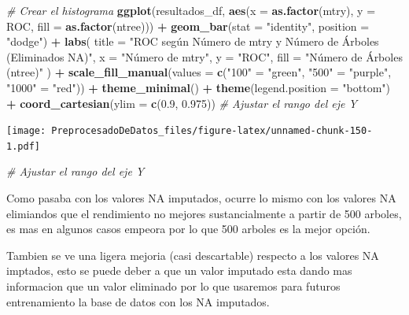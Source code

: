 \documentclass[
]{article}
\newenvironment{Shaded}{\begin{snugshade}}{\end{snugshade}}
\newcommand{\AttributeTok}[1]{\textcolor[rgb]{0.13,0.29,0.53}{#1}}
\newcommand{\CommentTok}[1]{\textcolor[rgb]{0.56,0.35,0.01}{\textit{#1}}}
\newcommand{\FloatTok}[1]{\textcolor[rgb]{0.00,0.00,0.81}{#1}}
\newcommand{\FunctionTok}[1]{\textcolor[rgb]{0.13,0.29,0.53}{\textbf{#1}}}
\newcommand{\NormalTok}[1]{#1}
\newcommand{\OtherTok}[1]{\textcolor[rgb]{0.56,0.35,0.01}{#1}}
\newcommand{\SpecialCharTok}[1]{\textcolor[rgb]{0.81,0.36,0.00}{\textbf{#1}}}
\newcommand{\StringTok}[1]{\textcolor[rgb]{0.31,0.60,0.02}{#1}}
\begin{document}
\begin{Shaded}
\begin{Highlighting}[]
\CommentTok{\# Crear el histograma}
\FunctionTok{ggplot}\NormalTok{(resultados\_df, }\FunctionTok{aes}\NormalTok{(}\AttributeTok{x =} \FunctionTok{as.factor}\NormalTok{(mtry), }\AttributeTok{y =}\NormalTok{ ROC, }\AttributeTok{fill =} \FunctionTok{as.factor}\NormalTok{(ntree))) }\SpecialCharTok{+}
  \FunctionTok{geom\_bar}\NormalTok{(}\AttributeTok{stat =} \StringTok{"identity"}\NormalTok{, }\AttributeTok{position =} \StringTok{"dodge"}\NormalTok{) }\SpecialCharTok{+}
  \FunctionTok{labs}\NormalTok{(}
    \AttributeTok{title =} \StringTok{"ROC según Número de mtry y Número de Árboles (Eliminados NA)"}\NormalTok{,}
    \AttributeTok{x =} \StringTok{"Número de mtry"}\NormalTok{,}
    \AttributeTok{y =} \StringTok{"ROC"}\NormalTok{,}
    \AttributeTok{fill =} \StringTok{"Número de Árboles (ntree)"}
\NormalTok{  ) }\SpecialCharTok{+}
  \FunctionTok{scale\_fill\_manual}\NormalTok{(}\AttributeTok{values =} \FunctionTok{c}\NormalTok{(}\StringTok{"100"} \OtherTok{=} \StringTok{"green"}\NormalTok{, }\StringTok{"500"} \OtherTok{=} \StringTok{"purple"}\NormalTok{, }\StringTok{"1000"} \OtherTok{=} \StringTok{"red"}\NormalTok{)) }\SpecialCharTok{+}
  \FunctionTok{theme\_minimal}\NormalTok{() }\SpecialCharTok{+}
  \FunctionTok{theme}\NormalTok{(}\AttributeTok{legend.position =} \StringTok{"bottom"}\NormalTok{) }\SpecialCharTok{+}
  \FunctionTok{coord\_cartesian}\NormalTok{(}\AttributeTok{ylim =} \FunctionTok{c}\NormalTok{(}\FloatTok{0.9}\NormalTok{, }\FloatTok{0.975}\NormalTok{))  }\CommentTok{\# Ajustar el rango del eje Y}
\end{Highlighting}
\end{Shaded}

\texttt{[image: PreprocesadoDeDatos\_files/figure-latex/unnamed-chunk-150-1.pdf]}

\begin{Shaded}
\begin{Highlighting}[]
  \CommentTok{\# Ajustar el rango del eje Y}
\end{Highlighting}
\end{Shaded}

Como pasaba con los valores NA imputados, ocurre lo mismo con los
valores NA elimiandos que el rendimiento no mejores sustancialmente a
partir de 500 arboles, es mas en algunos casos empeora por lo que 500
arboles es la mejor opción.

Tambien se ve una ligera mejoria (casi descartable) respecto a los
valores NA imptados, esto se puede deber a que un valor imputado esta
dando mas informacion que un valor eliminado por lo que usaremos para
futuros entrenamiento la base de datos con los NA imputados.
\end{document}
